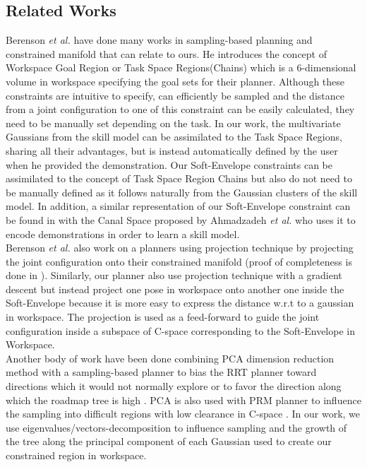 \documentclass[letterpaper, 10 pt, conference]{ieeeconf}  %
\begin{document}
\subsection{Related Works}
 Berenson \textit{et al.} have done many works in sampling-based planning and constrained manifold that can relate to ours. He introduces the concept of Workspace Goal Region \cite{Berenson_WGR} or Task Space Regions(Chains) \cite{BerensonTSR} which is a 6-dimensional volume in workspace specifying the goal sets for their planner. Although these constraints are intuitive to specify, can efficiently be sampled and the distance from a joint configuration to one of this constraint can be easily calculated, they need to be manually set depending on the task. In our work, the multivariate Gaussians from the skill model can be assimilated to the Task Space Regions, sharing all their advantages, but is instead automatically defined by the user when he provided the demonstration. Our Soft-Envelope constraints can be assimilated to the concept of Task Space Region Chains but also do not need to be manually defined as it follows naturally from the Gaussian clusters of the skill model.
In addition, a similar representation of our Soft-Envelope constraint can be found in \cite{CanalSpace} with the Canal Space proposed by Ahmadzadeh \textit{et al.}  who uses it to encode demonstrations in order to learn a skill model.\\
Berenson \textit{et al.} also work on a planners using projection technique \cite{Berenson_WGR} \cite{Berenson_Gradient} by projecting the joint configuration onto their constrained manifold (proof of completeness is done in \cite{Berenson_2010_6558} ). Similarly, our planner also use projection technique with a gradient descent but instead project one pose in workspace onto another one inside the Soft-Envelope because it is more easy to express the distance w.r.t to a gaussian in workspace. The projection is used as a feed-forward to guide the joint configuration inside a subspace of C-space corresponding to the Soft-Envelope in Workspace. \\

Another body of work have been done combining PCA dimension reduction method with a sampling-based planner to bias the RRT planner toward directions which it would not normally explore \cite{balancing_statespace_coveragePCA} or to favor the direction along which the roadmap tree is high \cite{PCARRT2}. PCA is also used with PRM planner to influence the sampling into difficult regions with low clearance in C-space \cite{PCA_PRM}. In our work, we use eigenvalues/vectors-decomposition to influence sampling and the growth of the tree along the principal component of each Gaussian used to create our constrained region in workspace.\\
\end{document}
